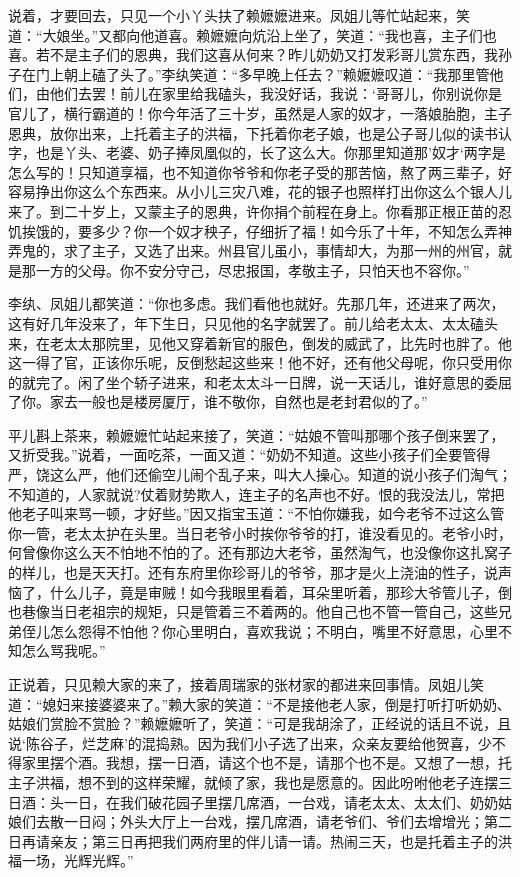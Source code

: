 \documentclass[12pt,oneside]{book}
\begin{document}
说着，才要回去，只见一个小丫头扶了赖嬷嬷进来。凤姐儿等忙站起来，笑道：“大娘坐。”又都向他道喜。赖嬷嬷向炕沿上坐了，笑道：“我也喜，主子们也喜。若不是主子们的恩典，我们这喜从何来？昨儿奶奶又打发彩哥儿赏东西，我孙子在门上朝上磕了头了。”李纨笑道：“多早晚上任去？”赖嬷嬷叹道：“我那里管他们，由他们去罢！前儿在家里给我磕头，我没好话，我说：‘哥哥儿，你别说你是官儿了，横行霸道的！你今年活了三十岁，虽然是人家的奴才，一落娘胎胞，主子恩典，放你出来，上托着主子的洪福，下托着你老子娘，也是公子哥儿似的读书认字，也是丫头、老婆、奶子捧凤凰似的，长了这么大。你那里知道那’奴才‘两字是怎么写的！只知道享福，也不知道你爷爷和你老子受的那苦恼，熬了两三辈子，好容易挣出你这么个东西来。从小儿三灾八难，花的银子也照样打出你这么个银人儿来了。到二十岁上，又蒙主子的恩典，许你捐个前程在身上。你看那正根正苗的忍饥挨饿的，要多少？你一个奴才秧子，仔细折了福！如今乐了十年，不知怎么弄神弄鬼的，求了主子，又选了出来。州县官儿虽小，事情却大，为那一州的州官，就是那一方的父母。你不安分守己，尽忠报国，孝敬主子，只怕天也不容你。”

李纨、凤姐儿都笑道：“你也多虑。我们看他也就好。先那几年，还进来了两次，这有好几年没来了，年下生日，只见他的名字就罢了。前儿给老太太、太太磕头来，在老太太那院里，见他又穿着新官的服色，倒发的威武了，比先时也胖了。他这一得了官，正该你乐呢，反倒愁起这些来！他不好，还有他父母呢，你只受用你的就完了。闲了坐个轿子进来，和老太太斗一日牌，说一天话儿，谁好意思的委屈了你。家去一般也是楼房厦厅，谁不敬你，自然也是老封君似的了。”

平儿斟上茶来，赖嬷嬷忙站起来接了，笑道：“姑娘不管叫那哪个孩子倒来罢了，又折受我。”说着，一面吃茶，一面又道：“奶奶不知道。这些小孩子们全要管得严，饶这么严，他们还偷空儿闹个乱子来，叫大人操心。知道的说小孩子们淘气；不知道的，人家就说?仗着财势欺人，连主子的名声也不好。恨的我没法儿，常把他老子叫来骂一顿，才好些。”因又指宝玉道：“不怕你嫌我，如今老爷不过这么管你一管，老太太护在头里。当日老爷小时挨你爷爷的打，谁没看见的。老爷小时，何曾像你这么天不怕地不怕的了。还有那边大老爷，虽然淘气，也没像你这扎窝子的样儿，也是天天打。还有东府里你珍哥儿的爷爷，那才是火上浇油的性子，说声恼了，什么儿子，竟是审贼！如今我眼里看着，耳朵里听着，那珍大爷管儿子，倒也巷像当日老祖宗的规矩，只是管着三不着两的。他自己也不管一管自己，这些兄弟侄儿怎么怨得不怕他？你心里明白，喜欢我说；不明白，嘴里不好意思，心里不知怎么骂我呢。”

正说着，只见赖大家的来了，接着周瑞家的张材家的都进来回事情。凤姐儿笑道：“媳妇来接婆婆来了。”赖大家的笑道：“不是接他老人家，倒是打听打听奶奶、姑娘们赏脸不赏脸？”赖嬷嬷听了，笑道：“可是我胡涂了，正经说的话且不说，且说‘陈谷子，烂芝麻’的混捣熟。因为我们小子选了出来，众亲友要给他贺喜，少不得家里摆个酒。我想，摆一日酒，请这个也不是，请那个也不是。又想了一想，托主子洪福，想不到的这样荣耀，就倾了家，我也是愿意的。因此吩咐他老子连摆三日酒：头一日，在我们破花园子里摆几席酒，一台戏，请老太太、太太们、奶奶姑娘们去散一日闷；外头大厅上一台戏，摆几席酒，请老爷们、爷们去增增光；第二日再请亲友；第三日再把我们两府里的伴儿请一请。热闹三天，也是托着主子的洪福一场，光辉光辉。”
\end{document}
